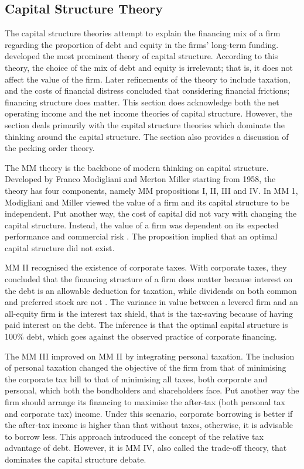\documentclass[a4paper, nobind]{templates/ociamthesis}
\begin{document}
\hypertarget{capital-structure-theory}{%
\subsection{Capital Structure Theory}\label{capital-structure-theory}}

\noindent The capital structure theories attempt to explain the financing mix of a firm regarding the proportion of debt and equity in the firms' long-term funding. \textcite{modigliani1958cost} developed the most prominent theory of capital structure. According to this theory, the choice of the mix of debt and equity is irrelevant; that is, it does not affect the value of the firm. Later refinements of the theory to include taxation, and the costs of financial distress concluded that considering financial frictions; financing structure does matter. This section does acknowledge both the net operating income and the net income theories of capital structure. However, the section deals primarily with the \textcite{modigliani1958cost} capital structure theories which dominate the thinking around the capital structure. The section also provides a discussion of the pecking order theory.

The MM theory is the backbone of modern thinking on capital structure. Developed by Franco Modigliani and Merton Miller starting from 1958, the theory has four components, namely MM propositions I, II, III and IV. In MM 1, Modigliani and Miller viewed the value of a firm and its capital structure to be independent. Put another way, the cost of capital did not vary with changing the capital structure. Instead, the value of a firm was dependent on its expected performance and commercial risk \autocite{myers2001capital,chang2015reconsideration}. The proposition implied that an optimal capital structure did not exist.

MM II recognised the existence of corporate taxes. With corporate taxes, they concluded that the financing structure of a firm does matter because interest on the debt is an allowable deduction for taxation, while dividends on both common and preferred stock are not \autocite{dempsey2014m}. The variance in value between a levered firm and an all-equity firm is the interest tax shield, that is the tax-saving because of having paid interest on the debt. The inference is that the optimal capital structure is 100\% debt, which goes against the observed practice of corporate financing.

The MM III improved on MM II by integrating personal taxation. The inclusion of personal taxation changed the objective of the firm from that of minimising the corporate tax bill to that of minimising all taxes, both corporate and personal, which both the bondholders and shareholders face. Put another way the firm should arrange its financing to maximise the after-tax (both personal tax and corporate tax) income. Under this scenario, corporate borrowing is better if the after-tax income is higher than that without taxes, otherwise, it is advisable to borrow less. This approach introduced the concept of the relative tax advantage of debt. However, it is MM IV, also called the trade-off theory, that dominates the capital structure debate.
\end{document}
